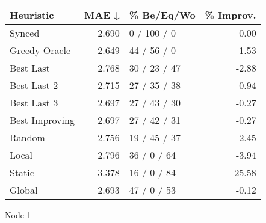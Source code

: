\begin{tabular}{lrlr}
\toprule
\textbf{Heuristic} & \textbf{MAE ↓} & \textbf{\% Be/Eq/Wo} & \textbf{\% Improv.} \\
\midrule
            Synced &          2.690 &          0 / 100 / 0 &                0.00 \\
     Greedy Oracle &          2.649 &          44 / 56 / 0 &                1.53 \\
         Best Last &          2.768 &         30 / 23 / 47 &               -2.88 \\
       Best Last 2 &          2.715 &         27 / 35 / 38 &               -0.94 \\
       Best Last 3 &          2.697 &         27 / 43 / 30 &               -0.27 \\
    Best Improving &          2.697 &         27 / 42 / 31 &               -0.27 \\
            Random &          2.756 &         19 / 45 / 37 &               -2.45 \\
             Local &          2.796 &          36 / 0 / 64 &               -3.94 \\
            Static &          3.378 &          16 / 0 / 84 &              -25.58 \\
            Global &          2.693 &          47 / 0 / 53 &               -0.12 \\
\bottomrule
\end{tabular}
\caption{Node 1}
\label{tab:hr_iid_lr05_le2_bs4_1}
